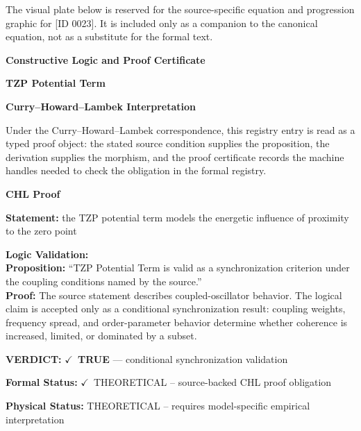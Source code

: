 \begingroup\footnotesize\sloppy
The visual plate below is reserved for the source-specific equation and progression graphic for [ID 0023]. It is included only as a companion to the canonical equation, not as a substitute for the formal text.
\par\endgroup
\ifTZPDarkEdition
{}
\fi

\clearpage
\begingroup\tzpsupportsetup
\noindent\textbf{\fontsize{10.8pt}{12.8pt}\selectfont [ID 0023] Constructive Logic and Proof Certificate}\par
\noindent\textbf{\fontsize{10pt}{12pt}\selectfont TZP Potential Term}\par
\vspace{0.45em}
\begingroup
\footnotesize
\setlength{\parskip}{0.22em}
\setlength{\parindent}{0pt}
\noindent\textbf{Curry--Howard--Lambek Interpretation}\par
Under the Curry--Howard--Lambek correspondence, this registry entry is read as a typed proof
object: the stated source condition supplies the proposition, the derivation supplies the
morphism, and the proof certificate records the machine handles needed to check the obligation
in the formal registry.

\vspace{0.45em}
\noindent\textbf{CHL Proof}\par
\textbf{Statement:} the TZP potential term models the energetic influence of proximity to the zero point

\textbf{Logic Validation:}\\
\textbf{Proposition:} ``TZP Potential Term is valid as a synchronization criterion under the coupling conditions
named by the source.''\\
\textbf{Proof:} The source statement describes coupled-oscillator behavior. The logical claim is
accepted only as a conditional synchronization result: coupling weights, frequency
spread, and order-parameter behavior determine whether coherence is increased, limited,
or dominated by a subset.

\textbf{VERDICT:} \ensuremath{\checkmark}\ \textbf{TRUE} --- conditional synchronization validation

\textbf{Formal Status:} \ensuremath{\checkmark}\ THEORETICAL -- source-backed CHL proof obligation

\textbf{Physical Status:} THEORETICAL -- requires model-specific empirical interpretation
\par\vspace{0.45em}
\par
\ifTZPDarkEdition
{}
\fi
\endgroup
\endgroup
